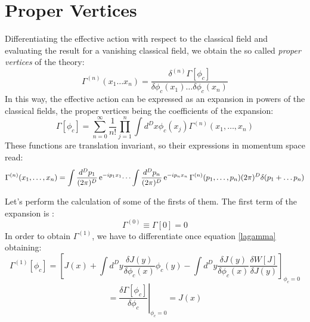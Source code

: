 \section{Proper Vertices}
Differentiating the effective action with respect to the classical field and evaluating the result for a vanishing classical field, we obtain
the so called \emph{proper vertices} of the theory:
\begin{equation}
\Gamma^{(n)} (x_1 \dots x_n) = \frac{\delta^{(n)}\Gamma[\phi_c]}{\delta\phi_c(x_1) \dots \delta \phi_c (x_n)}
\end{equation}
In this way, the effective action can be expressed as an expansion in powers of the classical fields, the proper vertices being the coefficients of the expansion:
\begin{equation}
\Gamma[\phi_c] = \sum_{n = 0}^\infty \frac{1}{n!}\prod_{j = 1}^{n}\int d^D x \phi_c(x_j)\Gamma^{(n)}(x_1, \dots, x_n)
\end{equation}
These functions are translation invariant, so their expressions in momentum space read:
\begin{equation*}
 \Gamma^{(n)}(x_1, \dots, x_n) = \int\frac{d^Dp_1}{(2\pi)^D}\operatorname{e}^{-ip_1x_1} \dots \int\frac{d^Dp_n}{(2\pi)^D} \operatorname{e}^{-ip_nx_n}\Gamma^{(n)}(p_1, \dots, p_n)(2\pi)^D\delta(p_1 + \dots p_n )
\end{equation*}

Let's perform the calculation of some of the firsts of them. The first term of the expansion is :
\begin{equation}
 \Gamma^{(0)}  \equiv \Gamma[0] =  0
\end{equation}
In order to obtain $\Gamma^{(1)}$, we have to differentiate once equation \eqref{lagamma} obtaining:
\begin{equation}
 \Gamma^{(1)}[\phi_c] =\left[ J(x) + \int d^Dy \frac{\delta J(y)}{\delta \phi_c (x)}\phi_c(y) -  \int d^Dy \frac{\delta J(y)}{\delta \phi_c (x)}\frac{\delta W[J]}{\delta J(y)} \right]_{\phi_c = 0}
\end{equation}
\begin{equation}
= \left.\frac{\delta \Gamma[\phi_c]}{\delta \phi_c} \right|_{\phi_c = 0} = J(x) 
\end{equation}

